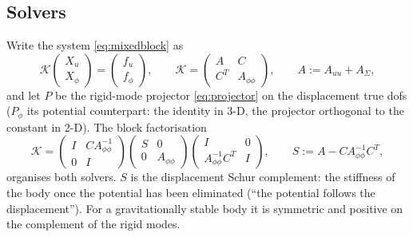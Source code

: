 \documentclass[11pt]{article}
\numberwithin{equation}{section}
\theoremstyle{remark}
\begin{document}
\subsection{Solvers}
\label{sec:mixed-solvers}

Write the system \eqref{eq:mixedblock} as
\begin{equation}
  \mathcal{K}\begin{pmatrix}X_u\\X_\phi\end{pmatrix}
  = \begin{pmatrix}f_u\\f_\phi\end{pmatrix}, \qquad
  \mathcal{K} = \begin{pmatrix} A & C\\ C^T & A_{\phi\phi}\end{pmatrix},
  \qquad A := A_{uu} + A_\Sigma ,
\end{equation}
and let $P$ be the rigid-mode projector \eqref{eq:projector} on the
displacement true dofs ($P_\phi$ its potential counterpart: the identity in
3-D, the projector orthogonal to the constant in 2-D). The block
factorisation
\begin{equation}
  \mathcal{K} = \begin{pmatrix} I & CA_{\phi\phi}^{-1}\\ 0 & I\end{pmatrix}
  \begin{pmatrix} S & 0\\ 0 & A_{\phi\phi}\end{pmatrix}
  \begin{pmatrix} I & 0\\ A_{\phi\phi}^{-1}C^T & I\end{pmatrix},
  \qquad S := A - CA_{\phi\phi}^{-1}C^T ,
  \label{eq:schurfact}
\end{equation}
organises both solvers. $S$ is the displacement Schur complement: the
stiffness of the body once the potential has been eliminated (``the
potential follows the displacement''). For a gravitationally stable body it
is symmetric and positive on the complement of the rigid modes.
\end{document}
